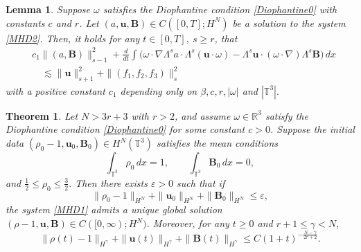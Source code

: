 \documentclass[10pt,a4paper]{amsart}
\newtheorem{theorem}{Theorem}
\newtheorem{lemma}{Lemma}
\def\b{ \mathbf{B} }
\def\u{ \mathbf{u} }
\begin{document}
\begin{lemma}\label{lemma-pri2}Suppose $\omega$ satisfies the Diophantine condition \eqref{Diophantine0}
with constants $c$ and $r$. Let $(a,\u,\b) \in C([0, T];H^N)$ be a solution to the  system \eqref{MHD2}.
Then, it holds for any $t\in[0,T]$, $s\geq r$, that
\begin{equation}
\begin{split}\label{pri-199-9LLLL}
&c_1\|(a,\b)\|_{s-1}^2+\frac{d}{dt}\int \Big(\omega\cdot\nabla\Lambda^{s}a\cdot\Lambda^{s}(\u\cdot\omega)-\Lambda^{s}\u\cdot(\omega\cdot\nabla)\Lambda^{s}\b\Big) \,dx\\
&\quad\lesssim \|\u\|_{s+1}^{2}+\|(f_1,f_2,f_3)\|_{s}^{2}
\end{split}
\end{equation}
with a positive constant $c_1$ depending only on $\beta,c,r,|\omega|$ and $|\mathbb T^3|.$
\end{lemma}

\begin{theorem}\label{dingli}
	Let $N>3r+3$ with $r>2$, and assume $\omega\in\mathbb{R}^3$ satisfy
	the Diophantine condition \eqref{Diophantine0} for some constant $c>0$.
	Suppose the initial data $(\rho_0-1, \mathbf{u}_0, \b_0)\in H^N(\mathbb{T}^3)$
	satisfies the mean conditions
	\begin{equation}\label{junzhi0}
		\int_{\mathbb{T}^3}\rho_0\,dx = 1, \qquad
		\int_{\mathbb{T}^3}\b_0\,dx = 0,
	\end{equation}
	and $\frac12\leq\rho_0\leq \frac32.$  Then there exists $\varepsilon>0$ such that if
	\begin{equation}\label{2026-6-27-3-1}
	\|\rho_0-1\|_{H^N} + \|\mathbf{u}_0\|_{H^N}
	+ \|\b_0\|_{H^N} \leq \varepsilon,
	\end{equation}
	the system \eqref{MHD1} admits a unique global solution
	$(\rho-1, \mathbf{u}, \b)\in C([0,\infty); H^N)$.
	Moreover, for any $t\geq 0$ and $r+1\leq\gamma< N$,
	\begin{equation}\label{decay}
		\|\rho(t)-1\|_{H^{\gamma}}
		+ \|\mathbf{u}(t)\|_{H^\gamma}
		+ \|\b(t)\|_{H^\gamma}
		\leq C(1+t)^{-\frac{N-\gamma}{2r+2}}.
	\end{equation}
\end{theorem}
\end{document}
